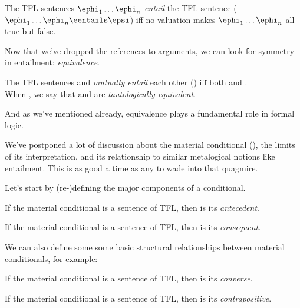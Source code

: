 \begin{definition}[Entailment]
  \label{def:tfl-entailment}
  The TFL sentences $\ephi_1\dots\ephi_n$ \emph{entail} the TFL sentence \epsi
  ($\ephi_1\dots\ephi_n\eentails\epsi$) iff no valuation makes
  $\ephi_1\dots\ephi_n$ all true but \epsi false.
\end{definition}

Now that we've dropped the references to arguments, we can look for symmetry in
entailment: \emph{equivalence}.

\begin{definition}
  \label{def:tfl-mutual-entailment}
  The TFL sentences \ephi and \epsi \emph{mutually entail} each other
  (\ephi\emutual\epsi) iff both \ephi\eentails\epsi and \epsi\eentails\ephi.
  \\
  When \ephi\emutual\epsi, we say that \ephi and \epsi are \emph{tautologically
  equivalent}.
\end{definition}

And as we've mentioned already, equivalence plays a fundamental role in formal
logic.

We've postponed a lot of discussion about the material conditional (\eif), the
limits of its interpretation, and its relationship to similar metalogical
notions like entailment. This is as good a time as any to wade into that
quagmire.

Let's start by (re-)defining the major components of a conditional.

\begin{definition}[Antecedent]
  If the material conditional \ephi\eif\epsi is a sentence of TFL, then \ephi
  is its \emph{antecedent}.
\end{definition}

\begin{definition}[Consequent]
  If the material conditional \ephi\eif\epsi is a sentence of TFL, then \epsi
  is its \emph{consequent}.
\end{definition}

We can also define some some basic structural relationships between material
conditionals, for example:

\begin{definition}[Converse]
  If the material conditional \ephi\eif\epsi is a sentence of TFL, then
  \epsi\eif\ephi is its \emph{converse}.
\end{definition}

\begin{definition}[Contrapositive]
  If the material conditional \ephi\eif\epsi is a sentence of TFL, then
  \enot\epsi\eif\enot\ephi is its \emph{contrapositive}.
\end{definition}

